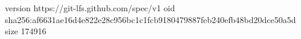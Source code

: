 version https://git-lfs.github.com/spec/v1
oid sha256:af6631ae16d4e822e28c956bc1c1fcb9180479887feb240efb48bd20dce50a5d
size 174916
